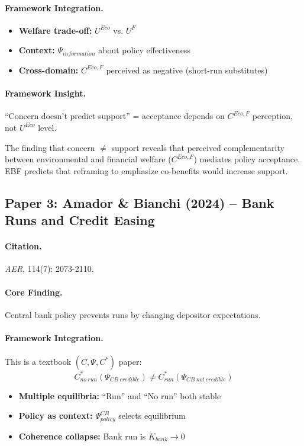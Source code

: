 \paragraph{Framework Integration.}
\begin{itemize}
  \item \textbf{Welfare trade-off:} $U^{Eco}$ vs. $U^F$
  \item \textbf{Context:} $\Psi_{information}$ about policy effectiveness
  \item \textbf{Cross-domain:} $C^{Eco,F}$ perceived as negative (short-run substitutes)
\end{itemize}

\paragraph{Framework Insight.}
``Concern doesn't predict support'' = acceptance depends on $C^{Eco,F}$ perception,
not $U^{Eco}$ level.

\begin{tcolorbox}[colback=yellow!5!white, colframe=yellow!75!black,
    title=EBF Insight: Climate Policy]
The finding that concern $\neq$ support reveals that perceived complementarity
between environmental and financial welfare ($C^{Eco,F}$) mediates policy
acceptance. EBF predicts that reframing to emphasize co-benefits would increase
support.
\end{tcolorbox}


\subsection{Paper 3: Amador \& Bianchi (2024) -- Bank Runs and Credit Easing}

\paragraph{Citation.}
\emph{AER}, 114(7): 2073-2110.

\paragraph{Core Finding.}
Central bank policy prevents runs by changing depositor expectations.

\paragraph{Framework Integration.}
This is a textbook $(C, \Psi, C^*)$ paper:
\begin{equation}
  C^*_{no\ run}(\Psi_{CB\ credible}) \neq C^*_{run}(\Psi_{CB\ not\ credible})
\end{equation}
\begin{itemize}
  \item \textbf{Multiple equilibria:} ``Run'' and ``No run'' both stable
  \item \textbf{Policy as context:} $\Psi_{policy}^{CB}$ selects equilibrium
  \item \textbf{Coherence collapse:} Bank run is $K_{bank} \to 0$
\end{itemize}

